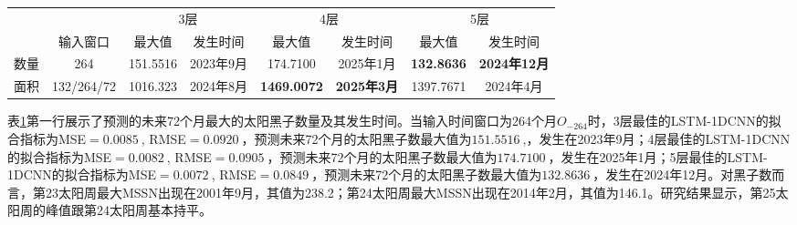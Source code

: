 \begin{table}[!htbp]
\centering
{}
\label{tab:ss_out_72}
\footnotesize
\begin{tabular}{cccccccc}
    \toprule
    &  & \multicolumn{2}{c}{3层} & \multicolumn{2}{c}{4层} & \multicolumn{2}{c}{5层}\\
    \cmidrule(lr){3-4} \cmidrule(lr){5-6} \cmidrule(lr){7-8}
    \noalign{\smallskip}
     & 输入窗口 & 最大值 & 发生时间 & 最大值 & 发生时间 & 最大值 & 发生时间 \\
    \midrule
    数量 & 264 & 151.5516 & 2023年9月 & 174.7100 & 2025年1月 & \textbf{132.8636} & \textbf{2024年12月} \\
    面积 & 132/264/72 & 1016.323 & 2024年8月 & \textbf{1469.0072} & \textbf{2025年3月} & 1397.7671 & 2024年4月 \\
    \bottomrule
  \end{tabular}
\end{table}


表\ref{tab:ss_out_72}第一行展示了预测的未来72个月最大的太阳黑子数量及其发生时间。当输入时间窗口为264个月$O_{-264}$时，3层最佳的LSTM-1DCNN的拟合指标为MSE$=\SI{0.0085}{}$, RMSE$=\SI{0.0920}{}$，预测未来72个月的太阳黑子数最大值为$\SI{151.5516}{}$,，发生在2023年9月；4层最佳的LSTM-1DCNN的拟合指标为MSE$=\SI{0.0082}{}$, RMSE$=\SI{0.0905}{}$，预测未来72个月的太阳黑子数最大值为$\SI{174.7100}{}$，发生在2025年1月；5层最佳的LSTM-1DCNN的拟合指标为MSE$=\SI{0.0072}{}$, RMSE$=\SI{0.0849}{}$，预测未来72个月的太阳黑子数最大值为$\SI{132.8636}{}$，发生在2024年12月。对黑子数而言，第23太阳周最大MSSN出现在2001年9月，其值为238.2；第24太阳周最大MSSN出现在2014年2月，其值为146.1。研究结果显示，第25太阳周的峰值跟第24太阳周基本持平。 

